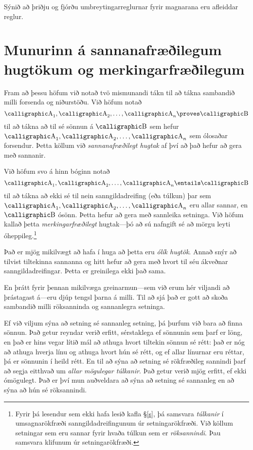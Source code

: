 \practiceproblems

\problempart
Sýnið að þriðju og fjórðu umbreytingarreglurnar fyrir magnarana eru afleiddar reglur.


\chapter{Munurinn á sannanafræðilegum hugtökum og merkingarfræðilegum}

Fram að þessu höfum við notað tvö mismunandi tákn til að tákna sambandið milli forsenda og niðurstöðu. Við höfum notað 
$$\meta{A}_1, \meta{A}_2, \ldots, \meta{A}_n \proves \meta{B}$$
til að tákna að til sé sönnun á $\meta{B}$ sem hefur $\meta{A}_1, \meta{A}_2, \ldots, \meta{A}_n$ sem ólosaðar forsendur. Þetta köllum við \emph{sannanafræðilegt hugtak} af því að það hefur að gera með sannanir.

Við höfum svo á hinn bóginn notað $$\meta{A}_1, \meta{A}_2, \ldots, \meta{A}_n \entails \meta{B}$$
til að tákna að ekki sé til nein sanngildadreifing (eða túlkun) þar sem $\meta{A}_1, \meta{A}_2, \ldots, \meta{A}_n$ eru allar sannar, en $\meta{B}$ ósönn. Þetta hefur að gera með sannleika setninga. Við höfum kallað þetta \emph{merkingarfræðilegt} hugtak---þó að sú nafngift sé að mörgu leyti óheppileg.\footnote{Fyrir þá lesendur sem ekki hafa lesið kafla \S\ref{s}, þá samsvara \emph{túlkanir} í umsagnarökfræði sanngildadreifingunum úr setningarökfræði. Við köllum setningar sem eru sannar fyrir hvaða túlkun sem er \emph{röksannindi}. Þau samsvara klifunum úr setningarökfræði. }

Það er mjög mikilvægt að hafa í huga að þetta eru \emph{ólík hugtök}. Annað snýr að tilvist tiltekinna sannanna og hitt hefur að gera með hvort til séu ákveðnar sanngildadreifingar. Þetta er greinilega ekki það sama.

En þrátt fyrir þennan mikilvæga greinarmun---sem við erum hér viljandi að þrástagast á---eru djúp tengsl þarna á milli. Til að sjá það er gott að skoða sambandið milli röksanninda og sannanlegra setninga. 

Ef við viljum sýna að setning sé sannanleg setning, þá þurfum við bara að finna sönnun. Það getur reyndar verið erfitt, sérstaklega ef sönnunin sem þarf er löng, en það er hins vegar lítið mál að athuga hvort tiltekin sönnun sé rétt: það er nóg að athuga hverja línu og athuga hvort hún sé rétt, og ef allar línurnar eru réttar, þá er sönnunin í heild rétt. En til að sýna að setning sé rökfræðileg sannindi þarf að segja eitthvað um \emph{allar mögulegar túlkanir}. Það getur verið mjög erfitt, ef ekki ómögulegt. Það er því mun auðveldara að sýna að setning sé sannanleg en að sýna að hún sé röksannindi.

